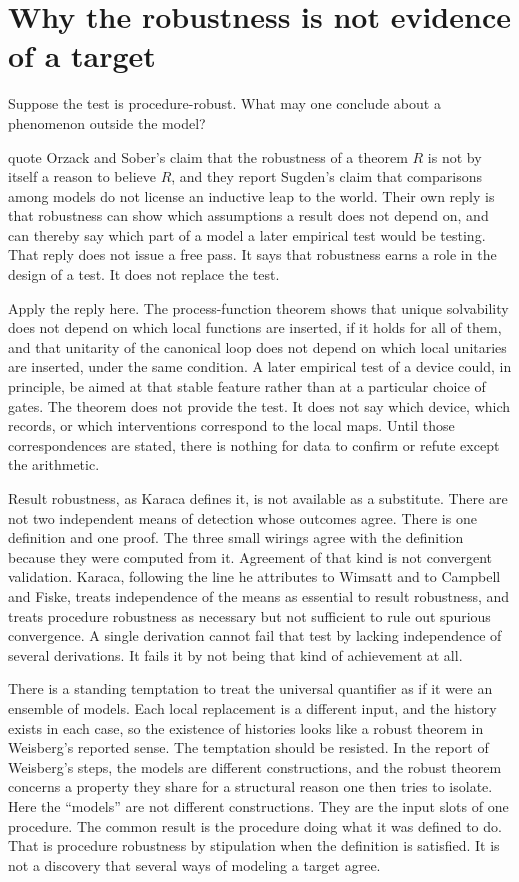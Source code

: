 \documentclass[12pt]{article}
\begin{document}
\section{Why the robustness is not evidence of a target}
\label{sec:evidence}

Suppose the test is procedure-robust. What may one conclude about a phenomenon outside the model?

\citet{kuorikoski2007} quote Orzack and Sober's claim that the robustness of a theorem \(R\) is not by itself a reason to believe \(R\), and they report Sugden's claim that comparisons among models do not license an inductive leap to the world. Their own reply is that robustness can show which assumptions a result does not depend on, and can thereby say which part of a model a later empirical test would be testing. That reply does not issue a free pass. It says that robustness earns a role in the design of a test. It does not replace the test.

Apply the reply here. The process-function theorem shows that unique solvability does not depend on which local functions are inserted, if it holds for all of them, and that unitarity of the canonical loop does not depend on which local unitaries are inserted, under the same condition. A later empirical test of a device could, in principle, be aimed at that stable feature rather than at a particular choice of gates. The theorem does not provide the test. It does not say which device, which records, or which interventions correspond to the local maps. Until those correspondences are stated, there is nothing for data to confirm or refute except the arithmetic.

Result robustness, as Karaca defines it, is not available as a substitute. There are not two independent means of detection whose outcomes agree. There is one definition and one proof. The three small wirings agree with the definition because they were computed from it. Agreement of that kind is not convergent validation. Karaca, following the line he attributes to Wimsatt and to Campbell and Fiske, treats independence of the means as essential to result robustness, and treats procedure robustness as necessary but not sufficient to rule out spurious convergence. A single derivation cannot fail that test by lacking independence of several derivations. It fails it by not being that kind of achievement at all.

There is a standing temptation to treat the universal quantifier as if it were an ensemble of models. Each local replacement is a different input, and the history exists in each case, so the existence of histories looks like a robust theorem in Weisberg's reported sense. The temptation should be resisted. In the report of Weisberg's steps, the models are different constructions, and the robust theorem concerns a property they share for a structural reason one then tries to isolate. Here the ``models'' are not different constructions. They are the input slots of one procedure. The common result is the procedure doing what it was defined to do. That is procedure robustness by stipulation when the definition is satisfied. It is not a discovery that several ways of modeling a target agree.
\end{document}
